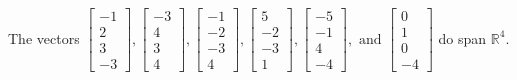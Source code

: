 \begin{exercise}
\begin{exerciseStatement}
  \end{exerciseStatement}
  \begin{exerciseAnswer}
   The vectors \(\left[\begin{array}{r}
-1 \\
2 \\
3 \\
-3
\end{array}\right] , \left[\begin{array}{r}
-3 \\
4 \\
3 \\
4
\end{array}\right] , \left[\begin{array}{r}
-1 \\
-2 \\
-3 \\
4
\end{array}\right] , \left[\begin{array}{r}
5 \\
-2 \\
-3 \\
1
\end{array}\right] , \left[\begin{array}{r}
-5 \\
-1 \\
4 \\
-4
\end{array}\right] , \text{ and } \left[\begin{array}{r}
0 \\
1 \\
0 \\
-4
\end{array}\right]\) 
  	 do  
	span \(\mathbb{R}^4\).
  


  \end{exerciseAnswer}
\end{exercise}